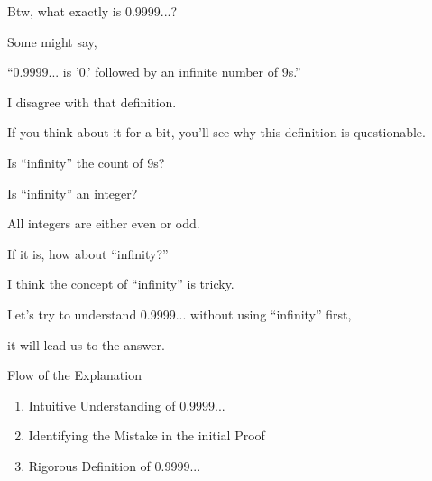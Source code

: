 %
%


\begin{frame}[c]{}{}
  Btw, what exactly is 0.9999...?
\end{frame}

\begin{frame}[c]{}{}
  Some might say,

  \vspace{4ex}

  ``0.9999... is '0.' followed by an infinite number of 9s.''
\end{frame}

\begin{frame}[c]{}{}
  I disagree with that definition.

  \vspace{4ex}

  If you think about it for a bit, you'll see why this definition is questionable.
\end{frame}

\begin{frame}[c]{}{}
  Is ``infinity'' the count of 9s?

  \vspace{4ex}

  Is ``infinity'' an integer?
\end{frame}

\begin{frame}[c]{}{}
  All integers are either even or odd.

  \vspace{2ex}

  If it is, how about ``infinity?''
\end{frame}

\begin{frame}[c]{}{}
  I think the concept of ``infinity'' is tricky.

  \vspace{2ex}

  Let's try to understand 0.9999... without using ``infinity'' first,

  \vspace{2ex}

  it will lead us to the answer.
\end{frame}

\begin{frame}[c]{}{}
  Flow of the Explanation

  \vspace{2ex}

  \begin{enumerate}
  \item Intuitive Understanding of 0.9999...
  \item Identifying the Mistake in the initial Proof
  \item Rigorous Definition of 0.9999...
  \end{enumerate}
\end{frame}
